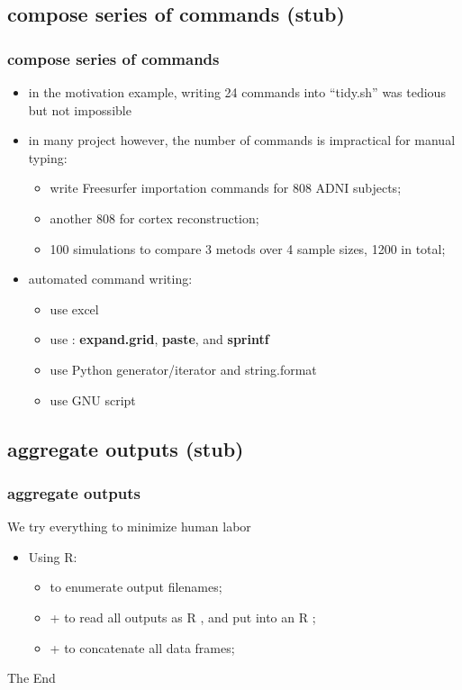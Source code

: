 \documentclass{beamer}
\begin{document}
\subsection{compose series of commands (stub)}
\begin{frame}
  \frametitle{compose series of commands}
  \begin{itemize}
  \item in the motivation example, writing 24 commands into
    ``tidy.sh'' was tedious but not impossible
  \item in many project however, the number of commands is impractical for manual typing:
    \begin{itemize}
    \item write Freesurfer importation commands for 808 ADNI subjects;
    \item another 808 for cortex reconstruction;
    \item 100 simulations to compare 3 metods over 4 sample sizes, 1200 in total;
    \end{itemize}
  \item automated command writing:
    \begin{itemize}
    \item use excel
    \item use : \textbf{expand.grid}, \textbf{paste}, and
      \textbf{sprintf}
    \item use Python generator/iterator and string.format
    \item use GNU script
    \end{itemize}
  \end{itemize}
\end{frame}
\subsection{aggregate outputs (stub)}
\begin{frame}
  \frametitle{aggregate outputs}
  We try everything to minimize human labor
  \begin{itemize}
  \item Using R:
    \begin{itemize}
    \item {} to enumerate output filenames;
    \item {} +  to read all outputs
      as R , and put into an R ;
    \item {} +  to concatenate all data frames;
    \end{itemize}
  \end{itemize}
\end{frame}
\begin{frame}
\Huge{\centerline{The End}}
\end{frame}
\end{document}
